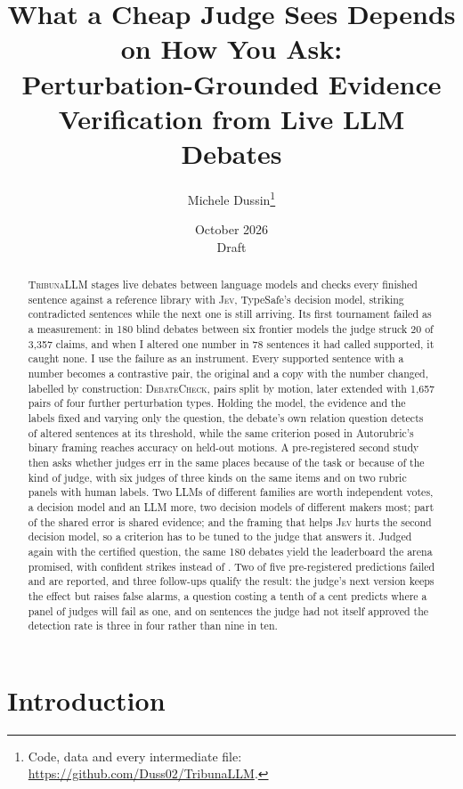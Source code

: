 \documentclass[11pt,a4paper]{article}
\title{What a Cheap Judge Sees Depends on How You Ask:\\
Perturbation-Grounded Evidence Verification from Live LLM Debates}
\author{Michele Dussin\thanks{Code, data and every intermediate file: \url{https://github.com/Duss02/TribunaLLM}.}}
\date{October 2026 \\ \small Draft}
\newcommand{\jev}{\textsc{Jev}}
\newcommand{\dc}{\textsc{DebateCheck}}
\newcommand{\tribuna}{\textsc{TribunaLLM}}
\begin{document}
\maketitle

\begin{abstract}
\tribuna{} stages live debates between language models and checks every finished sentence against a reference library with \jev{}, TypeSafe's decision model, striking contradicted sentences while the next one is still arriving. Its first tournament failed as a measurement: in 180 blind debates between six frontier models the judge struck 20 of 3,357 claims, and when I altered one number in 78 sentences it had called supported, it caught none. I use the failure as an instrument. Every supported sentence with a number becomes a contrastive pair, the original and a copy with the number changed, labelled by construction: \dc{}, \nPairs{} pairs split by motion, later extended with 1,657 pairs of four further perturbation types. Holding the model, the evidence and the labels fixed and varying only the question, the debate's own relation question detects \detLooseTwoZero{} of altered sentences at its threshold, while the same criterion posed in Autorubric's binary framing \citep{rao2026autorubric} reaches \arAllJevchoiceAcc{} accuracy on held-out motions. A pre-registered second study then asks whether judges err in the same places because of the task or because of the kind of judge, with six judges of three kinds on the same items and on two rubric panels with human labels. Two LLMs of different families are worth \studyVotesLunaChatDeepSeekPro{} independent votes, a decision model and an LLM more, two decision models of different makers most; part of the shared error is shared evidence; and the framing that helps \jev{} hurts the second decision model, so a criterion has to be tuned to the judge that answers it. Judged again with the certified question, the same 180 debates yield the leaderboard the arena promised, with \studyLbContradictedConfident{} confident strikes instead of \studyLbPilotStruck{}. Two of five pre-registered predictions failed and are reported, and three follow-ups qualify the result: the judge's next version keeps the effect but raises false alarms, a question costing a tenth of a cent predicts where a panel of judges will fail as one, and on sentences the judge had not itself approved the detection rate is three in four rather than nine in ten.
\end{abstract}

\section{Introduction}
\end{document}
